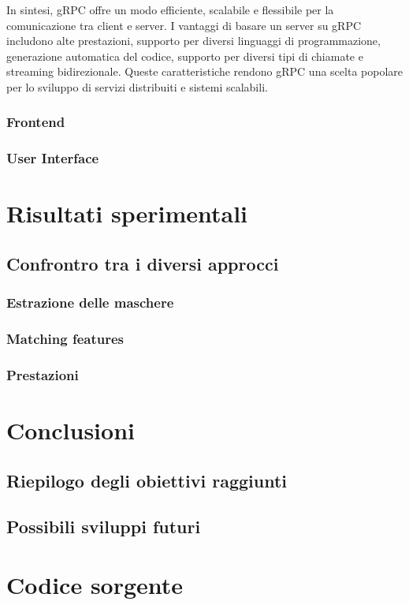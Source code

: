 \documentclass[a4paper,12pt]{report}
\begin{document}
    In sintesi, gRPC offre un modo efficiente, scalabile e flessibile per la comunicazione tra client e server. I vantaggi di basare un server su gRPC includono alte prestazioni, supporto per diversi linguaggi di programmazione, generazione automatica del codice, supporto per diversi tipi di chiamate e streaming bidirezionale. Queste caratteristiche rendono gRPC una scelta popolare per lo sviluppo di servizi distribuiti e sistemi scalabili.

    
    \subsection{Frontend}
    \subsection{User Interface}

\chapter{Risultati sperimentali}
  \section{Confrontro tra i diversi approcci}
    \subsection{Estrazione delle maschere}
    \subsection{Matching features}
    \subsection{Prestazioni}

\chapter{Conclusioni}
  \section{Riepilogo degli obiettivi raggiunti}
  \section{Possibili sviluppi futuri}

\chapter{Codice sorgente}
\end{document}
